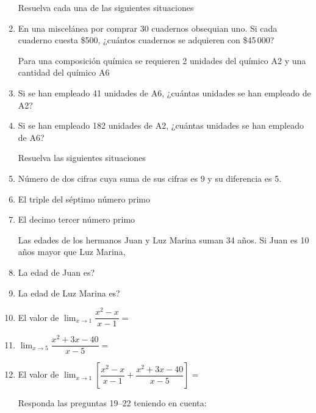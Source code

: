 \documentclass[letterpaper,twoside]{article}
\begin{document}
\begin{multicols}{2}
\begin{enumerate}
Resuelva cada una de las siguientes situaciones
\item En una miscelánea por comprar 30 cuadernos obsequian uno. Si cada cuaderno cuesta \$500, ¿cuántos cuadernos se adquieren con \$45\,000?

Para una composición química se requieren 2 unidades del químico A2 y una cantidad del químico A6
\item Si se han empleado 41 unidades de A6, ¿cuántas unidades se han empleado de A2?
\item Si se han empleado 182 unidades de A2, ¿cuántas unidades se han empleado de A6?

Resuelva las siguientes situaciones
\item Número de dos cifras cuya suma de sus cifras es 9 y su diferencia es 5.
\item El triple del séptimo número primo
\item El decimo tercer número primo

Las edades de los hermanos Juan y Luz Marina suman 34 años. Si Juan es 10 años mayor que Luz Marina, 
\item La edad de Juan es?
\item La edad de Luz Marina es?
\item El valor de $\displaystyle{\lim_{x\rightarrow 1}\dfrac{x^{2}-x}{x-1}}=$
\item $\displaystyle{\lim_{x\rightarrow 5}\dfrac{x^{2}+3x-40}{x-5}}=$
\item El valor de $\displaystyle{\lim_{x\rightarrow 1}\left[\dfrac{x^{2}-x}{x-1}+\dfrac{x^{2}+3x-40}{x-5}\right]}=$

Responda las preguntas 19--22 teniendo en cuenta:


\end{enumerate}
\end{multicols}
\end{document}
